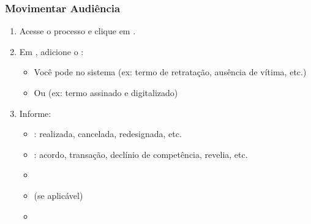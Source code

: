 \documentclass[letterpaper,10pt,brazil]{sphinxmanual}
\begin{document}
\subsubsection{Movimentar Audiência}
\label{\detokenize{projud_47_movimentacaoaudiencia:movimentar-audiencia}}\begin{enumerate}
%
\item {} 
\sphinxAtStartPar
Acesse o processo e clique em .

\item {} 
\sphinxAtStartPar
Em , adicione o :
\begin{itemize}
\item {} 
\sphinxAtStartPar
Você pode  no sistema (ex: termo de retratação, ausência de vítima, etc.)

\item {} 
\sphinxAtStartPar
Ou  (ex: termo assinado e digitalizado)

\end{itemize}

\item {} 
\sphinxAtStartPar
Informe:
\begin{itemize}
\item {} 
\sphinxAtStartPar
{}: realizada, cancelada, redesignada, etc.

\item {} 
\sphinxAtStartPar
{}: acordo, transação, declínio de competência, revelia, etc.

\item {} 
\sphinxAtStartPar
{}

\item {} 
\sphinxAtStartPar
{} (se aplicável)

\item {} 
\sphinxAtStartPar
{}

\end{itemize}

\end{enumerate}
\end{document}
